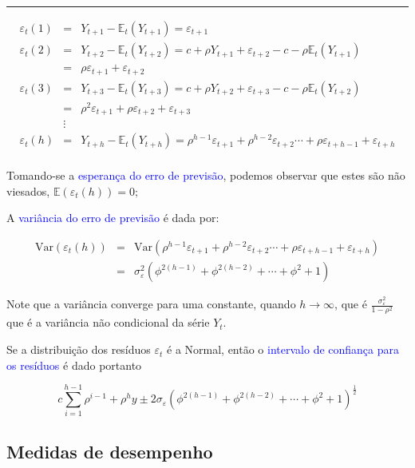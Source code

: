 \documentclass[
]{book}
\theoremstyle{definition}
\theoremstyle{definition}
\theoremstyle{definition}
\theoremstyle{remark}
\begin{document}
\begin{center}\rule{0.5\linewidth}{0.5pt}\end{center}

\begin{eqnarray*}
 \varepsilon_t(1)&=&Y_{t+1}-\mathbb{E}_t(Y_{t+1})=\varepsilon_{t+1}\\
 \varepsilon_t(2)&=&Y_{t+2}-\mathbb{E}_t(Y_{t+2})=c+\rho Y_{t+1}+\varepsilon_{t+2}-c-\rho \mathbb{E}_t(Y_{t+1})\\
       &=&\rho\varepsilon_{t+1}+\varepsilon_{t+2}\\
 \varepsilon_t(3)&=&Y_{t+3}-\mathbb{E}_t(Y_{t+3})=c+\rho Y_{t+2}+\varepsilon_{t+3}-c-\rho \mathbb{E}_t(Y_{t+2})\\
       &=&\rho^2\varepsilon_{t+1}+\rho\varepsilon_{t+2}+\varepsilon_{t+3}\\
       &\vdots&\\
 \varepsilon_t(h)&=&Y_{t+h}-\mathbb{E}_t(Y_{t+h}) = \rho^{h-1}\varepsilon_{t+1}+\rho^{h-2}\varepsilon_{t+2}\cdots+\rho\varepsilon_{t+h-1}+\varepsilon_{t+h}\\
\end{eqnarray*}

Tomando-se a \textcolor{blue}{esperança  do erro de previsão}, podemos observar que estes são não viesados, \(\mathbb{E}(\varepsilon_t(h))=0;\)

A \textcolor{blue}{ variância do erro de previsão} é dada por:

\begin{eqnarray*}
 \mbox{Var}(\varepsilon_t(h))&=&\mbox{Var}\left(\rho^{h-1}\varepsilon_{t+1}+\rho^{h-2}\varepsilon_{t+2}\cdots+\rho\varepsilon_{t+h-1}+\varepsilon_{t+h}\right)\\
            &=&\sigma_{\varepsilon}^2\left(\phi^{2(h-1)}+\phi^{2(h-2)}+\cdots+\phi^{2}+1\right)
\end{eqnarray*}

Note que a variância converge para uma constante, quando \(h\rightarrow\infty\), que é
\(\frac{\sigma_{\varepsilon}^2}{1-\rho^2}\) que é a variância não condicional da série \(Y_t\).

Se a distribuição dos resíduos \(\varepsilon_t\) é a Normal, então o \textcolor{blue}{intervalo de confiança para os resíduos} é dado portanto

\[c\sum_{i=1}^{h-1}\rho^{i-1}+\rho^h y \pm 2\sigma_{\varepsilon}\left(\phi^{2(h-1)}+\phi^{2(h-2)}+\cdots+\phi^{2}+1\right)^\frac{1}{2}\]

\hypertarget{medidas-de-desempenho}{%
\subsection{Medidas de desempenho}\label{medidas-de-desempenho}}
\end{document}
